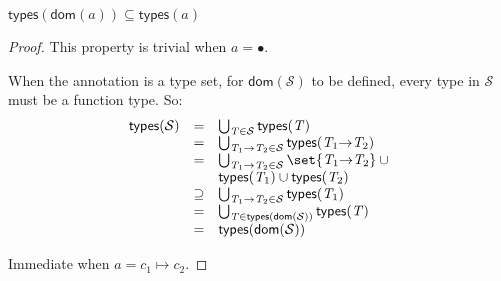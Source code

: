 \documentclass[9pt]{extarticle}
\newcommand{\ottnt}[1]{\mathit{#1}}
\newcommand{\ottsym}[1]{#1}
\begin{document}
\begin{lemma}
  \label{lem:typesdom}
  $  \mathsf{types} (  \mathsf{dom} ( \ottnt{a} )  )   \subseteq   \mathsf{types} ( \ottnt{a} )  $
\begin{proof}
    This property is trivial when $\ottnt{a}  \ottsym{=}  \bullet$.

    {\iffull
    When the annotation is a type set, for $ \mathsf{dom} ( \mathcal{S} ) $ to be
    defined, every type in $\mathcal{S}$ must be a function type. So:
\[ \begin{array}{rcl}
       \mathsf{types} ( \mathcal{S} )  &=& \bigcup_{ \ottnt{T}  \in  \mathcal{S} }  \mathsf{types} ( \ottnt{T} )  \\
      &=& \bigcup_{  \ottnt{T_{{\mathrm{1}}}} \mathord{ \rightarrow } \ottnt{T_{{\mathrm{2}}}}   \in  \mathcal{S} }  \mathsf{types} (  \ottnt{T_{{\mathrm{1}}}} \mathord{ \rightarrow } \ottnt{T_{{\mathrm{2}}}}  )  \\
      &=& \bigcup_{  \ottnt{T_{{\mathrm{1}}}} \mathord{ \rightarrow } \ottnt{T_{{\mathrm{2}}}}   \in  \mathcal{S} }    \set{   \ottnt{T_{{\mathrm{1}}}} \mathord{ \rightarrow } \ottnt{T_{{\mathrm{2}}}}   }   \cup  {} \\  &  &   \mathsf{types} ( \ottnt{T_{{\mathrm{1}}}} )    \cup   \mathsf{types} ( \ottnt{T_{{\mathrm{2}}}} )   \\
      &\supseteq& \bigcup_{  \ottnt{T_{{\mathrm{1}}}} \mathord{ \rightarrow } \ottnt{T_{{\mathrm{2}}}}   \in  \mathcal{S} }  \mathsf{types} ( \ottnt{T_{{\mathrm{1}}}} )  \\
      &=& \bigcup_{ \ottnt{T}  \in   \mathsf{types} (  \mathsf{dom} ( \mathcal{S} )  )  }  \mathsf{types} ( \ottnt{T} )  \\
      &=&  \mathsf{types} (  \mathsf{dom} ( \mathcal{S} )  ) 
    \end{array} \]
    \fi}

    Immediate when $\ottnt{a}  \ottsym{=}  \ottnt{c_{{\mathrm{1}}}}  \mapsto  \ottnt{c_{{\mathrm{2}}}}$.
  \end{proof}
\end{lemma}
\end{document}
